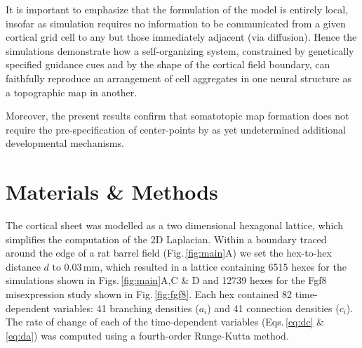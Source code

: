 \documentclass[9pt,lineno,draft]{elife}
\begin{document}
It is important to emphasize that the formulation of the model is entirely
local, insofar as simulation requires no information to be communicated from a
given cortical grid cell to any but those immediately adjacent (via
diffusion). Hence the simulations demonstrate how a self-organizing system,
constrained by genetically specified guidance cues and by the shape of the
cortical field boundary, can faithfully reproduce an arrangement of cell
aggregates in one neural structure as a topographic map in another.

Moreover, the present results confirm that somatotopic map formation does not
require the pre-specification of center-points by as yet undetermined
additional developmental mechanisms.

\section{Materials \& Methods}

%
%

The cortical sheet was modelled as a two dimensional hexagonal lattice, which
simplifies the computation of the 2D Laplacian. Within a boundary traced
around the edge of a
rat barrel field (Fig.\,\ref{fig:main}A) we set the hex-to-hex distance
$d$ to 0.03\,mm, which resulted in a lattice containing 6515 hexes for the
simulations shown in Figs.\,\ref{fig:main}A,C \& D and 12739 hexes for the Fgf8
misexpression study shown in Fig.\,\ref{fig:fgf8}. Each hex contained 82 time-dependent
variables: 41 branching densities ($a_i$) and 41 connection densities ($c_i$).
The rate of change of each of the time-dependent variables (Eqs.\,\ref{eq:dc}
\& \ref{eq:da}) was computed using a fourth-order Runge-Kutta method.
\end{document}
